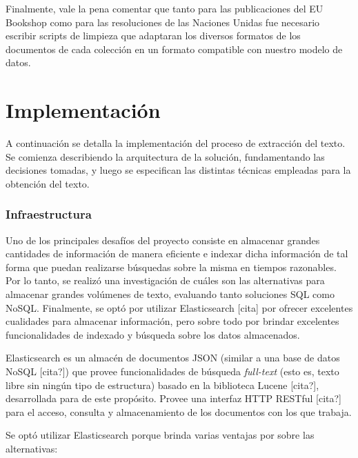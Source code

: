 Finalmente, vale la pena comentar que tanto para las publicaciones del EU Bookshop como para las
resoluciones de las Naciones Unidas fue necesario escribir scripts de limpieza que adaptaran los diversos
formatos de los documentos de cada colección en un formato compatible con nuestro modelo de datos.


\section{Implementación}

A continuación se detalla la implementación del proceso de extracción del texto. Se comienza
describiendo la arquitectura de la solución, fundamentando las decisiones tomadas, y luego se
especifican las distintas técnicas empleadas para la obtención del texto.


\subsubsection{Infraestructura}

Uno de los principales desafíos del proyecto consiste en almacenar grandes cantidades de información
de manera eficiente e indexar dicha información de tal forma que puedan realizarse búsquedas sobre
la misma en tiempos razonables. Por lo tanto, se realizó una investigación de cuáles son las alternativas
para almacenar grandes volúmenes de texto, evaluando tanto soluciones SQL como NoSQL. Finalmente,
se optó por utilizar Elasticsearch [cita] por ofrecer excelentes cualidades para almacenar información,
pero sobre todo por brindar excelentes funcionalidades de indexado y búsqueda sobre los datos almacenados.

Elasticsearch es un almacén de documentos JSON (similar a una base de datos NoSQL [cita?]) que provee
funcionalidades de búsqueda \textit{full-text} (esto es, texto libre sin ningún tipo de estructura)
basado en la biblioteca Lucene [cita?], desarrollada para de este propósito. Provee una interfaz
HTTP RESTful [cita?] para el acceso, consulta y almacenamiento de los documentos con los que trabaja.

Se optó utilizar Elasticsearch porque brinda varias ventajas por sobre las alternativas:

